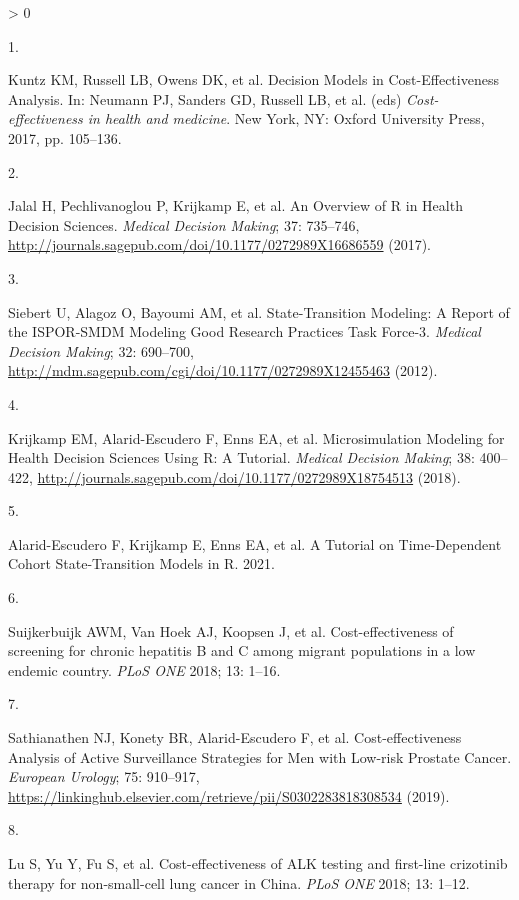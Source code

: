 \documentclass[
]{article}
\newlength{\cslhangindent}
\newlength{\csllabelwidth}
\newenvironment{CSLReferences}[2] %
 {%
  \setlength{\parindent}{0pt}
  \ifodd #1 \everypar{\setlength{\hangindent}{\cslhangindent}}\ignorespaces\fi
  \ifnum #2 > 0
  \setlength{\parskip}{#2\baselineskip}
  \fi
 }%
 {}
\newcommand{\CSLLeftMargin}[1]{\parbox[t]{\csllabelwidth}{#1}}
\newcommand{\CSLRightInline}[1]{\parbox[t]{\linewidth - \csllabelwidth}{#1}\break}
\begin{document}
\hypertarget{refs}{}
\begin{CSLReferences}{0}{0}
\leavevmode\hypertarget{ref-Kuntz2017}{}%
\CSLLeftMargin{1. }
\CSLRightInline{Kuntz KM, Russell LB, Owens DK, et al. {Decision Models in Cost-Effectiveness Analysis}. In: Neumann PJ, Sanders GD, Russell LB, et al. (eds) \emph{Cost-effectiveness in health and medicine}. New York, NY: Oxford University Press, 2017, pp. 105--136.}

\leavevmode\hypertarget{ref-Jalal2017b}{}%
\CSLLeftMargin{2. }
\CSLRightInline{Jalal H, Pechlivanoglou P, Krijkamp E, et al. {An Overview of R in Health Decision Sciences}. \emph{Medical Decision Making}; 37: 735--746, \url{http://journals.sagepub.com/doi/10.1177/0272989X16686559} (2017).}

\leavevmode\hypertarget{ref-Siebert2012c}{}%
\CSLLeftMargin{3. }
\CSLRightInline{Siebert U, Alagoz O, Bayoumi AM, et al. {State-Transition Modeling: A Report of the ISPOR-SMDM Modeling Good Research Practices Task Force-3}. \emph{Medical Decision Making}; 32: 690--700, \url{http://mdm.sagepub.com/cgi/doi/10.1177/0272989X12455463} (2012).}

\leavevmode\hypertarget{ref-Krijkamp2018}{}%
\CSLLeftMargin{4. }
\CSLRightInline{Krijkamp EM, Alarid-Escudero F, Enns EA, et al. {Microsimulation Modeling for Health Decision Sciences Using R: A Tutorial}. \emph{Medical Decision Making}; 38: 400--422, \url{http://journals.sagepub.com/doi/10.1177/0272989X18754513} (2018).}

\leavevmode\hypertarget{ref-Alarid-Escudero2021b}{}%
\CSLLeftMargin{5. }
\CSLRightInline{Alarid-Escudero F, Krijkamp E, Enns EA, et al. {A Tutorial on Time-Dependent Cohort State-Transition Models in R}. 2021.}

\leavevmode\hypertarget{ref-Suijkerbuijk2018}{}%
\CSLLeftMargin{6. }
\CSLRightInline{Suijkerbuijk AWM, Van Hoek AJ, Koopsen J, et al. {Cost-effectiveness of screening for chronic hepatitis B and C among migrant populations in a low endemic country}. \emph{PLoS ONE} 2018; 13: 1--16.}

\leavevmode\hypertarget{ref-Sathianathen2018a}{}%
\CSLLeftMargin{7. }
\CSLRightInline{Sathianathen NJ, Konety BR, Alarid-Escudero F, et al. {Cost-effectiveness Analysis of Active Surveillance Strategies for Men with Low-risk Prostate Cancer}. \emph{European Urology}; 75: 910--917, \url{https://linkinghub.elsevier.com/retrieve/pii/S0302283818308534} (2019).}

\leavevmode\hypertarget{ref-Lu2018b}{}%
\CSLLeftMargin{8. }
\CSLRightInline{Lu S, Yu Y, Fu S, et al. {Cost-effectiveness of ALK testing and first-line crizotinib therapy for non-small-cell lung cancer in China}. \emph{PLoS ONE} 2018; 13: 1--12.}


\end{CSLReferences}
\end{document}
